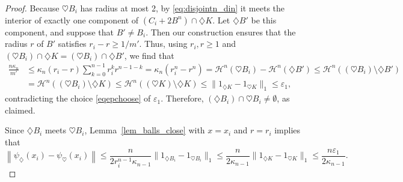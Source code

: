 \documentclass[10pt,a4paper]{amsart}
\newcommand{\cH}{{\mathcal H}}
\newcommand{\di}{\diamondsuit}
\newcommand{\ee}{\varepsilon}
\begin{document}
\begin{proof}
Because $\heartsuit B_i$ has radius at most 2, by \eqref{eq:disjointn_din} it meets the interior of exactly one component of $(C_i+2B^n)\cap \di K$.  Let $\di B'$ be this component, and suppose that $B'\neq B_i$. Then our construction ensures that the radius $r$ of $B'$ satisfies $r_i-r\ge 1/m'$.  Thus, using $r_i,r\ge 1$ and $(\heartsuit B_i)\cap \di K=(\heartsuit B_i)\cap \di B'$, we find that
\begin{align*}
\frac{n\kappa_n}{m'}&\le  \kappa_n(r_i-r)\sum_{k=0}^{n-1}r_i^kr^{n-1-k}= \kappa_n(r_i^n-r^n)
=\cH^n(\heartsuit B_i)-\cH^n(\di B')
\le \cH^n\left( (\heartsuit B_i)\setminus\di B'\right)\nonumber\\
& = \cH^n((\heartsuit B_i)\setminus \di K)\le \cH^n\left( (\heartsuit K)\setminus\di K\right)\le \|1_{\di K}-1_{\heartsuit K}\|_1\le \ee_1,
\end{align*}
contradicting the choice \eqref{eqepchoose} of $\ee_1$. Therefore, $(\di B_i)\cap \heartsuit B_i\neq\emptyset$, as claimed.

Since $\di B_i$ meets $\heartsuit B_i$, Lemma~\ref{lem_balls_close} with $x=x_i$ and $r=r_i$ implies that
\begin{equation}\label{first_fixed_pointn}
\left\|\psi_{\di}(x_i)-\psi_{\heartsuit}(x_i)\right\|
\le \frac{n}{2r_i^{n-1}\kappa_{n-1}}\|1_{\di B_i}-1_{\heartsuit B_i}\|_1
\le\frac{n}{2\kappa_{n-1}} \|1_{\di K}-1_{\heartsuit K}\|_1\le \frac{n\ee_1}{2\kappa_{n-1}}.
\end{equation}


\end{proof}
\end{document}
